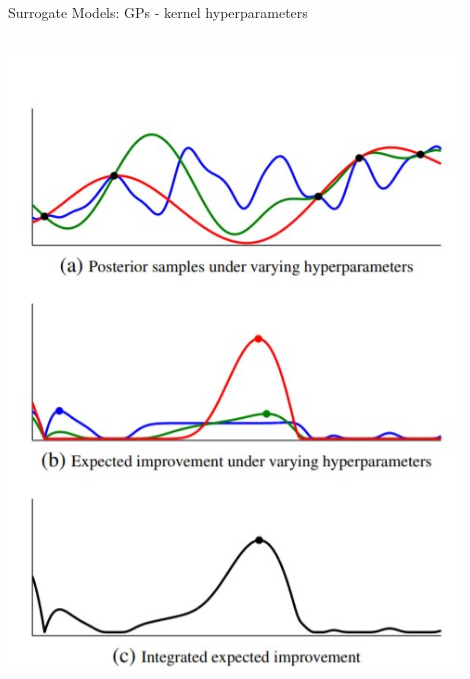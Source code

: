 \begin{frame}[c]{Surrogate Models: GPs - kernel hyperparameters}
\begin{columns}[T]
\begin{column}{.38\textwidth}
\includegraphics[width=0.9\textwidth]{images/surrogate_models/kernel_hp_mcmc.jpg}
\end{column}%
\end{columns}

\end{frame}

